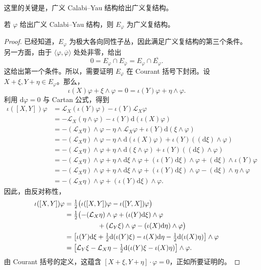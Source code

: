 这里的关键是，广义 Calabi--Yau 结构给出广义复结构。

\begin{theorem}\label{thm:6.38}
若 $\varphi$ 给出广义 Calabi--Yau 结构，则 $E_\varphi$ 为广义复结构。
\end{theorem}
\begin{proof}
已经知道，$E_\varphi$ 为极大各向同性子丛，因此满足广义复结构的第三个条件。另一方面，由于 $\langle\varphi,\overline\varphi\rangle$ 处处非零，给出
\[
0=E_\varphi\cap E_{\overline\varphi}
=E_\varphi\cap\overline{E_\varphi}.
\]
这给出第一个条件。所以，需要证明 $E_\varphi$ 在 Courant 括号下封闭。设 $X+\xi,Y+\eta\in E_\varphi$。那么，
\[
\iota(X)\varphi+\xi\wedge\varphi=0
=\iota(Y)\varphi+\eta\wedge\varphi.
\]
利用 $\mathrm d\varphi=0$ 与 Cartan 公式，得到
\[
\begin{aligned}
\iota([X,Y])\varphi
&=\mathcal L_X(\iota(Y)\varphi)-\iota(Y)\mathcal L_X\varphi\\
&=-\mathcal L_X(\eta\wedge\varphi)-\iota(Y)\mathrm d(\iota(X)\varphi)\\
&=-(\mathcal L_X\eta)\wedge\varphi-\eta\wedge\mathcal L_X\varphi
+\iota(Y)\mathrm d(\xi\wedge\varphi)\\
&=-(\mathcal L_X\eta)\wedge\varphi-\eta\wedge\mathrm d(\iota(X)\varphi)
+\iota(Y)((\mathrm d\xi)\wedge\varphi)\\
&=-(\mathcal L_X\eta)\wedge\varphi+\eta\wedge\mathrm d(\xi\wedge\varphi)
+\iota(Y)((\mathrm d\xi)\wedge\varphi)\\
&=-(\mathcal L_X\eta)\wedge\varphi+\eta\wedge\mathrm d\xi\wedge\varphi
+(\iota(Y)\mathrm d\xi)\wedge\varphi+(\mathrm d\xi)\wedge\iota(Y)\varphi\\
&=-(\mathcal L_X\eta)\wedge\varphi+\eta\wedge\mathrm d\xi\wedge\varphi
+(\iota(Y)\mathrm d\xi)\wedge\varphi-(\mathrm d\xi)\wedge\eta\wedge\varphi\\
&=-(\mathcal L_X\eta)\wedge\varphi+(\iota(Y)\mathrm d\xi)\wedge\varphi.
\end{aligned}
\]
因此，由反对称性，
\[
\begin{aligned}
\iota([X,Y])\varphi
&=\tfrac12\bigl(\iota([X,Y])\varphi-\iota([Y,X])\varphi\bigr)\\
&=\tfrac12\bigl(-(\mathcal L_X\eta)\wedge\varphi
+(\iota(Y)\mathrm d\xi)\wedge\varphi\\
&\hspace{17mm}+(\mathcal L_Y\xi)\wedge\varphi
-(\iota(X)\mathrm d\eta)\wedge\varphi\bigr)\\
&=\bigl[\iota(Y)\mathrm d\xi+\tfrac12\mathrm d(\iota(Y)\xi)
-\iota(X)\mathrm d\eta-\tfrac12\mathrm d(\iota(X)\eta)\bigr]\wedge\varphi\\
&=\bigl[\mathcal L_Y\xi-\mathcal L_X\eta
-\tfrac12\mathrm d(\iota(Y)\xi-\iota(X)\eta)\bigr]\wedge\varphi.
\end{aligned}
\]
由 Courant 括号的定义，这蕴含 $[X+\xi,Y+\eta]\cdot\varphi=0$，正如所要证明的。
\end{proof}

